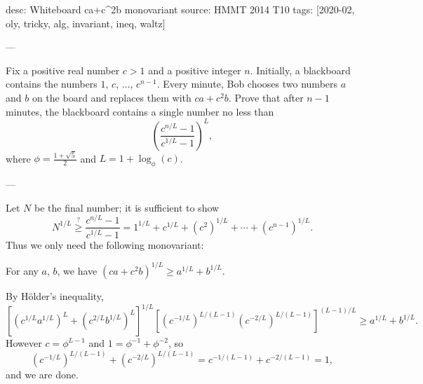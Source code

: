 desc: Whiteboard ca+c^2b monovariant
source: HMMT 2014 T10
tags: [2020-02, oly, tricky, alg, invariant, ineq, waltz]

---

Fix a positive real number $c>1$ and a positive integer $n$. Initially, a blackboard contains the numbers $1$, $c$, $\ldots$, $c^{n-1}$. Every minute, Bob chooses two numbers $a$ and $b$ on the board and replaces them with $ca+c^2b$. Prove that after $n-1$ minutes, the blackboard contains a single number no less than \[\left(\frac{c^{n/L}-1}{c^{1/L}-1}\right)^L,\]
where $\phi=\tfrac{1+\sqrt5}2$ and $L=1+\log_{\phi}(c)$.

---

Let $N$ be the final number; it is sufficient to show \[N^{1/L}\stackrel?\ge\frac{c^{n/L}-1}{c^{1/L}-1}=1^{1/L}+c^{1/L}+\left(c^2\right)^{1/L}+\cdots+\left(c^{n-1}\right)^{1/L}.\]
Thus we only need the following monovariant:
\begin{claim*}
    For any $a$, $b$, we have $\left(ca+c^2b\right)^{1/L}\ge a^{1/L}+b^{1/L}$.
\end{claim*}
By H\"older's inequality, \[ \left[\left(c^{1/L}a^{1/L}\right)^L+\left(c^{2/L}b^{1/L}\right)^L\right]^{1/L}\left[\left(c^{-1/L}\right)^{L/(L-1)}\left(c^{-2/L}\right)^{L/(L-1)}\right]^{(L-1)/L}\ge a^{1/L}+b^{1/L}.\]
However $c=\phi^{L-1}$ and $1=\phi^{-1}+\phi^{-2}$, so \[\left(c^{-1/L}\right)^{L/(L-1)}+\left(c^{-2/L}\right)^{L/(L-1)}=c^{-1/(L-1)}+c^{-2/(L-1)}=1,\]
and we are done.
